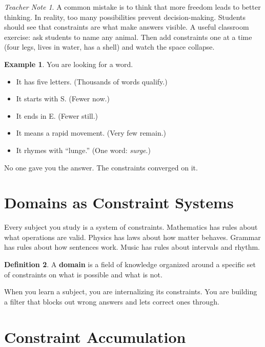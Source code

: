 \documentclass[11pt]{book}
\theoremstyle{definition}
\newtheorem{definition}{Definition}[chapter]
\newtheorem{example}[definition]{Example}
\theoremstyle{remark}
\newtheorem{teachernote}{Teacher Note}[chapter]
\begin{document}
\begin{teachernote}
A common mistake is to think that more freedom leads to better thinking.
In reality, too many possibilities prevent decision-making. Students
should see that constraints are what make answers visible. A useful
classroom exercise: ask students to name any animal. Then add constraints
one at a time (four legs, lives in water, has a shell) and watch the
space collapse.
\end{teachernote}

\begin{example}
You are looking for a word.
\begin{itemize}
  \item It has five letters. (Thousands of words qualify.)
  \item It starts with S. (Fewer now.)
  \item It ends in E. (Fewer still.)
  \item It means a rapid movement. (Very few remain.)
  \item It rhymes with ``lunge.'' (One word: \emph{surge}.)
\end{itemize}
No one gave you the answer. The constraints converged on it.
\end{example}

\section{Domains as Constraint Systems}

Every subject you study is a system of constraints. Mathematics has rules
about what operations are valid. Physics has laws about how matter behaves.
Grammar has rules about how sentences work. Music has rules about intervals
and rhythm.

\begin{definition}
A \textbf{domain} is a field of knowledge organized around a specific set
of constraints on what is possible and what is not.
\end{definition}

When you learn a subject, you are internalizing its constraints. You are
building a filter that blocks out wrong answers and lets correct ones through.

\section{Constraint Accumulation}
\end{document}
